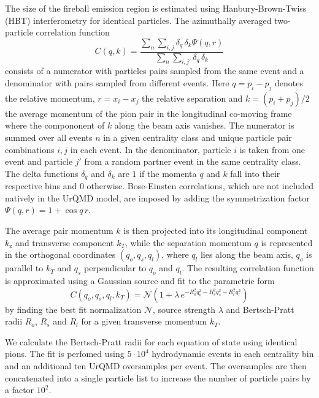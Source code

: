 \documentclass[aps,prc,reprint,amsmath,nofootinbib,superscriptaddress]{revtex4-1}
\begin{document}
The size of the fireball emission region is estimated using Hanbury-Brown-Twiss (HBT) interferometry for identical particles. The azimuthally averaged two-particle correlation function 
\begin{equation}
 \label{hbt}
 C(q, k) = \frac{\sum\limits_n \sum\limits_{i, j} \delta_{q} \, \delta_{k}\Psi(q,r)}{\sum\limits_{n} \sum\limits_{i,j'} \delta_{q} \, \delta_{k}}
\end{equation}
consists of a numerator with particles pairs sampled from the same event and a denominator with pairs sampled from different events. Here $q = p_i - p_j$ denotes the relative momentum, $r=x_i-x_j$ the relative separation and $k = (p_i + p_j)/2$ the average momentum of the pion pair in the longitudinal co-moving 
frame where the compononent of $k$ along the beam axis vanishes. The numerator is summed over all events $n$ in a given centrality class and unique particle pair combinations $i,j$ in each event. In the denominator, particle $i$ is
taken from one event and particle $j'$ from a random partner event in the same centrality class. The delta functions $\delta_q$ and $\delta_k$ are $1$ if the momenta $q$ and $k$ fall into their respective bins and $0$ otherwise. Bose-Einsten 
correlations, which are not included natively in the UrQMD model, are imposed by adding the symmetrization factor $\Psi(q,r) = 1 + \cos q\,r$. 

The average pair momentum $k$ is then projected into its longitudinal component $k_\text{z}$ and transverse component $k_T$, while the separation momentum $q$ is represented in the orthogonal coordinates 
$(q_o, q_s, q_l)$, where $q_l$ lies along the beam axis, $q_o$ is parallel to $k_T$ and $q_s$ perpendicular to $q_o$ and $q_l$. The resulting correlation function is approximated using a Gaussian source and 
fit to the parametric form
\begin{equation}
 \label{fitfunction}
 C(q_o, q_s, q_l, k_T) = \mathcal{N} \left(1 + \lambda\, e^{-R_o^2 q_o^2 - R_s^2 q_s^2 - R_l^2 q_l^2} \right) 
\end{equation}
by finding the best fit normalization $\mathcal{N}$, source strength $\lambda$ and Bertsch-Pratt radii $R_o$, $R_s$ and $R_l$ for a given transverse momentum $k_T$. 

We calculate the Bertsch-Pratt radii for each equation of state using identical pions. The fit is perfomed using $5\cdot10^4$ hydrodynamic events in each centrality bin and an additional ten UrQMD oversamples per event. The oversamples are then concatenated into a single particle list to increase the number of particle pairs by a factor $10^2$.
\end{document}
